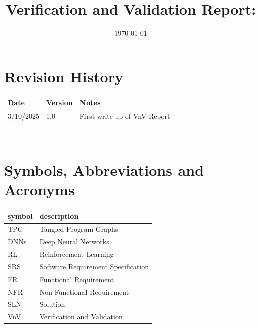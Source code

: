 \documentclass[12pt, titlepage]{article}
\begin{document}
\title{Verification and Validation Report: \progname} 
\author{\authname}
\date{\today}
	
\maketitle


\section{Revision History}

\begin{tabularx}{\textwidth}{p{3cm}p{2cm}X}
\toprule {\bf Date} & {\bf Version} & {\bf Notes}\\
\midrule
3/10/2025 & 1.0 & First write up of VnV Report \\
\bottomrule
\end{tabularx}

~\newpage

\section{Symbols, Abbreviations and Acronyms}

\renewcommand{\arraystretch}{1.2}
\begin{tabular}{l l} 
  \toprule		
  \textbf{symbol} & \textbf{description}\\
  \midrule 
  TPG & Tangled Program Graphs\\
  DNNs & Deep Neural Networks\\
  RL & Reinforcement Learning\\
  SRS & Software Requirement Specification\\
  FR & Functional Requirement\\
  NFR & Non-Functional Requirement\\
  SLN & Solution\\
  VnV & Verification and Validation\\
  \bottomrule
\end{tabular}\\


\newpage

\tableofcontents

\listoftables %

\listoffigures %
\end{document}
